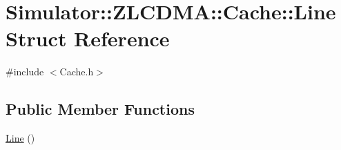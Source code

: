 \hypertarget{struct_simulator_1_1_z_l_c_d_m_a_1_1_cache_1_1_line}{\section{Simulator\+:\+:Z\+L\+C\+D\+M\+A\+:\+:Cache\+:\+:Line Struct Reference}
\label{struct_simulator_1_1_z_l_c_d_m_a_1_1_cache_1_1_line}
}


{\ttfamily \#include $<$Cache.\+h$>$}

\subsection*{Public Member Functions}
\begin{DoxyCompactItemize}
\item 
\hyperlink{struct_simulator_1_1_z_l_c_d_m_a_1_1_cache_1_1_line_a765813d36f197c1b7d126a1b2ae1268a}{Line} ()
\end{DoxyCompactItemize}
